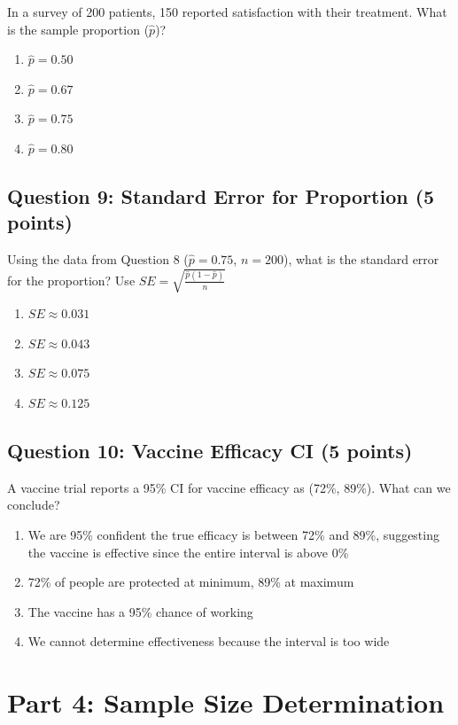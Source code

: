 \documentclass[11pt]{article}
\begin{document}
In a survey of 200 patients, 150 reported satisfaction with their treatment. What is the sample proportion ($\hat{p}$)?

\begin{enumerate}[label=\alph*)]
\item $\hat{p} = 0.50$
\item $\hat{p} = 0.67$
\item $\hat{p} = 0.75$
\item $\hat{p} = 0.80$
\end{enumerate}

\subsection*{Question 9: Standard Error for Proportion (5 points)}

Using the data from Question 8 ($\hat{p} = 0.75$, $n = 200$), what is the standard error for the proportion? Use $SE = \sqrt{\frac{\hat{p}(1-\hat{p})}{n}}$

\begin{enumerate}[label=\alph*)]
\item $SE \approx 0.031$
\item $SE \approx 0.043$
\item $SE \approx 0.075$
\item $SE \approx 0.125$
\end{enumerate}

\subsection*{Question 10: Vaccine Efficacy CI (5 points)}

A vaccine trial reports a 95\% CI for vaccine efficacy as (72\%, 89\%). What can we conclude?

\begin{enumerate}[label=\alph*)]
\item We are 95\% confident the true efficacy is between 72\% and 89\%, suggesting the vaccine is effective since the entire interval is above 0\%
\item 72\% of people are protected at minimum, 89\% at maximum
\item The vaccine has a 95\% chance of working
\item We cannot determine effectiveness because the interval is too wide
\end{enumerate}

\section*{Part 4: Sample Size Determination}
\end{document}
